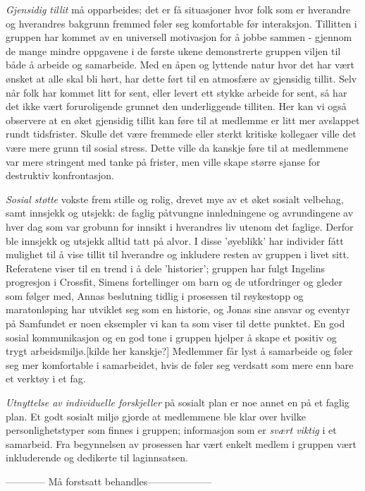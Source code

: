 \emph{Gjensidig tillit} må opparbeides; det er få situasjoner hvor folk som er hverandre og hverandres bakgrunn fremmed føler seg komfortable før interaksjon. Tillitten i gruppen har kommet av en universell motivasjon for å jobbe sammen - gjennom de mange mindre oppgavene i de første ukene demonstrerte gruppen viljen til både å arbeide og samarbeide. Med en åpen og lyttende natur hvor det har vært ønsket at alle skal bli hørt, har dette ført til en atmosfære av gjensidig tillit. Selv når folk har kommet litt for sent, eller levert ett stykke arbeide for sent, så har det ikke vært foruroligende grunnet den underliggende tilliten. Her kan vi også observere at en øket gjensidig tillit kan føre til at medlemme er litt mer avslappet rundt tidsfrister. Skulle det være fremmede eller sterkt kritiske kollegaer ville det være mere grunn til sosial stress. Dette ville da kanskje føre til at medlemmene var mere stringent med tanke på frister, men ville skape større sjanse for destruktiv konfrontasjon. 

\emph{Sosial støtte} vokste frem stille og rolig, drevet mye av et øket sosialt velbehag, samt innsjekk og utsjekk: de faglig påtvungne innledningene og avrundingene av hver dag som var grobunn for innsikt i hverandres liv utenom det faglige. Derfor ble innsjekk og utsjekk alltid tatt på alvor. I disse 'øyeblikk' har individer fått mulighet til å vise tillit til hverandre og inkludere resten av gruppen i livet sitt. Referatene viser til en trend i å dele 'historier'; gruppen har fulgt Ingelins progresjon i Crossfit, Simens fortellinger om barn og de utfordringer og gleder som følger med, Annas beslutning tidlig i prosessen til røykestopp og maratonløping har utviklet seg som en historie, og Jonas sine ansvar og eventyr på Samfundet er noen eksempler vi kan ta som viser til dette punktet. En god sosial kommunikasjon og en god tone i gruppen hjelper å skape et positiv og trygt arbeidsmiljø.[kilde her kanskje?] Medlemmer får lyst å samarbeide og føler seg mer komfortable i samarbeidet, hvis de føler seg verdsatt som mere enn bare et verktøy i et fag.

\emph{Utnyttelse av individuelle forskjeller} på sosialt plan er noe annet en på et faglig plan. Et godt sosialt miljø gjorde at medlemmene ble klar over hvilke personlighetstyper som finnes i gruppen; informasjon som er \emph{svært viktig} i et samarbeid. Fra begynnelsen av prosessen har vært enkelt medlem i gruppen vært inkluderende og dedikerte til laginnsatsen. 

------------ Må forstsatt behandles--------------------

